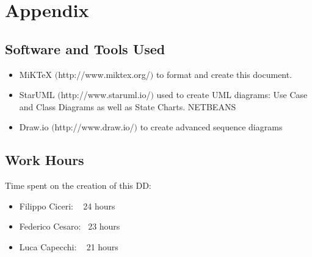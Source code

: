 \section{Appendix}

	\subsection{Software and Tools Used}
	\begin{itemize}
		\item MiKTeX $($http://www.miktex.org/$)$ to format and create this document.
		\item StarUML $($http://www.staruml.io/$)$ used to create UML diagrams: Use Case and Class Diagrams as well as State Charts. NETBEANS
		\item Draw.io $($http://www.draw.io/$)$ to create advanced sequence diagrams
	\end{itemize}

	\subsection{Work Hours}
		Time spent on the creation of this DD:
		\begin{itemize}
			\item Filippo Ciceri: ~ 24 hours
			\item Federico Cesaro: ~23 hours
			\item Luca Capecchi: ~ 21 hours
		\end{itemize}

